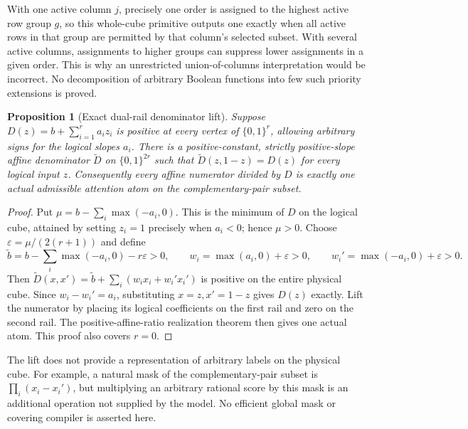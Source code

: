 \documentclass[11pt]{article}
\newtheorem{proposition}[theorem]{Proposition}
\newcommand{\1}{\mathbf 1}
\begin{document}
With one active column $j$, precisely one order is assigned to the highest
active row group $g$, so this whole-cube primitive outputs one exactly when
all active rows in that group are permitted by that column's selected
subset. With several active columns, assignments to higher groups can
suppress lower assignments in a given order. This is why an unrestricted
union-of-columns interpretation would be incorrect. No decomposition of
arbitrary Boolean functions into few such priority extensions is proved.

\begin{proposition}[Exact dual-rail denominator lift]
Suppose $D(z)=b+\sum_{i=1}^r a_i z_i$ is positive at every vertex of
$\{0,1\}^r$, allowing arbitrary signs for the logical slopes $a_i$.
There is a positive-constant, strictly positive-slope affine denominator
$\widetilde D$ on $\{0,1\}^{2r}$ such that
$\widetilde D(z,1-z)=D(z)$ for every logical input $z$.
Consequently every affine numerator divided by $D$ is exactly one actual
admissible attention atom on the complementary-pair subset.
\end{proposition}
\begin{proof}
Put $\mu=b-\sum_i\max(-a_i,0)$. This is the minimum of $D$ on the
logical cube, attained by setting $z_i=1$ precisely when $a_i<0$; hence
$\mu>0$. Choose $\varepsilon=\mu/(2(r+1))$ and define
\[
 \widetilde b=b-\sum_i\max(-a_i,0)-r\varepsilon>0,\qquad
 w_i=\max(a_i,0)+\varepsilon>0,\qquad
 w_i'=\max(-a_i,0)+\varepsilon>0.
\]
Then $\widetilde D(x,x')=\widetilde b+\sum_i(w_i x_i+w_i'x_i')$
is positive on the entire physical cube. Since $w_i-w_i'=a_i$,
substituting $x=z,x'=1-z$ gives $D(z)$ exactly. Lift the numerator by
placing its logical coefficients on the first rail and zero on the second
rail. The positive-affine-ratio realization theorem then gives one actual
atom. This proof also covers $r=0$.
\end{proof}

The lift does not provide a representation of arbitrary labels on the
physical cube. For example, a natural mask of the complementary-pair
subset is $\prod_i(x_i-x_i')$, but multiplying an arbitrary rational
score by this mask is an additional operation not supplied by the model.
No efficient global mask or covering compiler is asserted here.
\end{document}
